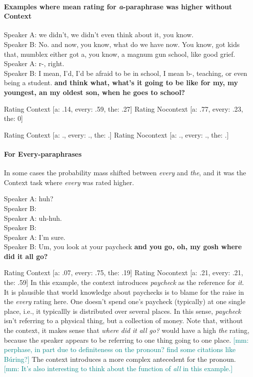 \documentclass[12pt,letterpaper,table,svgnames,dvipsnames]{article}
\newcommand{\mm}[1]{\textcolor{teal}{[mm: #1]}}
\begin{document}
\paragraph{Examples where mean rating for \emph{a}-paraphrase was higher without Context}

\begin{exe}
    \ex {}
    Speaker A: we didn't, we didn't even think about it, you know.\\
    Speaker B: No. and now, you know, what do we have now. You know, got kids that, mumblex either got a, you know, a magnum gun school, like good grief.\\
    Speaker A: r-, right.\\
    Speaker B: I mean, I'd, I'd be afraid to be in school, I mean b-, teaching, or even being a student. \textbf{and think what, what's it going to be like for my, my youngest, an my oldest son, when he goes to school?}
\end{exe}
Rating Context [a: .14, every: .59, the: .27]
Rating Nocontext [a: .77, every: .23, the: 0]


\begin{exe}
    \ex {}
\end{exe}
Rating Context [a: ., every: ., the: .]
Rating Nocontext [a: ., every: ., the: .]


\paragraph{For Every-paraphrases}

In some cases the probability mass shifted between \emph{every} and \emph{the}, and it was the Context task where \emph{every} was rated higher.
\begin{exe}
    \ex {}
    Speaker A: huh?\\
    Speaker B: \\
    Speaker A: uh-huh.\\
    Speaker B: \\
    Speaker A: I'm sure.\\
    Speaker B: Um, you look at your paycheck \textbf{and you go, oh, my gosh where did it all go?}
\end{exe}
Rating Context [a: .07, every: .75, the: .19]
Rating Nocontext [a: .21, every: .21, the: .59]
In this example, the context introduces \emph{paycheck} as the reference for \emph{it}. It is plausible that world knowledge about paychecks is to blame for the raise in the \emph{every} rating here. One doesn't spend one's paycheck (typically) at one single place, i.e., it typicallly is distributed over several places. In this sense, \emph{paycheck} isn't referring to a physical thing, but a collection of money. Note that, without the context, it makes sense that \emph{where did it all go?} would have a high \emph{the} rating, because the speaker appears to be referring to one thing going to one place. \mm{perphase, in part due to definiteness on the pronoun? find some citations like B\'uring?} The context introduces a more complex antecedent for the pronoun. \mm{It's also interesting to think about the function of \emph{all} in this example.}
\end{document}
